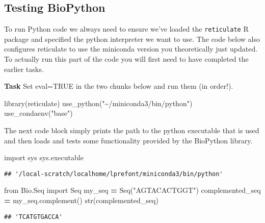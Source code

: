 \documentclass[
]{article}
\newenvironment{Shaded}{\begin{snugshade}}{\end{snugshade}}
\newcommand{\BuiltInTok}[1]{#1}
\newcommand{\FunctionTok}[1]{\textcolor[rgb]{0.00,0.00,0.00}{#1}}
\newcommand{\ImportTok}[1]{#1}
\newcommand{\NormalTok}[1]{#1}
\newcommand{\OperatorTok}[1]{\textcolor[rgb]{0.81,0.36,0.00}{\textbf{#1}}}
\newcommand{\StringTok}[1]{\textcolor[rgb]{0.31,0.60,0.02}{#1}}
\begin{document}
\hypertarget{testing-biopython}{%
\subsection{Testing BioPython}\label{testing-biopython}}

To run Python code we always need to ensure we've loaded the
\texttt{reticulate} R package and specified the python interpreter we
want to use. The code below also configures reticulate to use the
miniconda version you theoretically just updated. To actually run this
part of the code you will first need to have completed the earlier
tasks.

\textbf{Task} Set eval=TRUE in the two chunks below and run them (in
order!).

\begin{Shaded}
\begin{Highlighting}[]
\FunctionTok{library}\NormalTok{(reticulate)}
\FunctionTok{use\_python}\NormalTok{(}\StringTok{"\textasciitilde{}/miniconda3/bin/python"}\NormalTok{)}
\FunctionTok{use\_condaenv}\NormalTok{(}\StringTok{"base"}\NormalTok{)}
\end{Highlighting}
\end{Shaded}

The next code block simply prints the path to the python executable that
is used and then loads and tests some functionality provided by the
BioPython library.

\begin{Shaded}
\begin{Highlighting}[]
\ImportTok{import}\NormalTok{ sys}
\NormalTok{sys.executable}
\end{Highlighting}
\end{Shaded}

\begin{verbatim}
## '/local-scratch/localhome/lprefont/miniconda3/bin/python'
\end{verbatim}

\begin{Shaded}
\begin{Highlighting}[]
\ImportTok{from}\NormalTok{ Bio.Seq }\ImportTok{import}\NormalTok{ Seq}
\NormalTok{my\_seq }\OperatorTok{=}\NormalTok{ Seq(}\StringTok{"AGTACACTGGT"}\NormalTok{)}
\NormalTok{complemented\_seq }\OperatorTok{=}\NormalTok{ my\_seq.complement()}
\BuiltInTok{str}\NormalTok{(complemented\_seq)}
\end{Highlighting}
\end{Shaded}

\begin{verbatim}
## 'TCATGTGACCA'
\end{verbatim}
\end{document}
